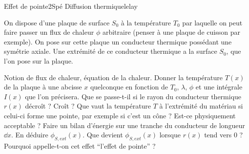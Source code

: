 \begin{exercise}{Effet de pointe}{2}{Spé}
{Diffusion thermique}{lelay}

On dispose d'une plaque de surface $S_0$ à la température $T_0$ par laquelle on peut faire passer un flux de chaleur $\phi$ arbitraire (penser à une plaque de cuisson par exemple). On pose sur cette plaque un conducteur thermique possédant une symétrie axiale. Une extrémité de ce conducteur thermique a la surface $S_0$, que l'on pose sur la plaque.

\begin{questions}
    \questioncours Notion de flux de chaleur, équation de la chaleur.
    \question Donner la température $T(x)$ de la plaque à une abcisse $x$ quelconque en fonction de $T_0$, $\lambda$, $\phi$ et une intégrale $I(x)$ que l'on précisera.
    \question Que se passe-t-il si le rayon du conducteur thermique $r(x)$ décroît ? Croît ?
    \question Que vaut la température $T$ à l'extrémité du matériau si celui-ci forme une pointe, par exemple si c'est un cône ? Est-ce physiquement acceptable ?
    \question Faire un bilan d'énergie sur une tranche du conducteur de longueur $\dd{x}$.
    \question En déduire $\phi_{S, ext}(x)$.
    \question Que devient $\phi_{S, ext}(x)$ lorsque $r(x)$ tend vers 0 ? Pourquoi appelle-t-on cet effet ``l'effet de pointe'' ?
\end{questions}

\end{exercise}
